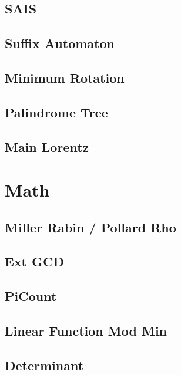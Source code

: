 \subsection{SAIS}

\subsection{Suffix Automaton}

\subsection{Minimum Rotation}

\subsection{Palindrome Tree}

\subsection{Main Lorentz}


\section{Math}
% 
\subsection{Miller Rabin / Pollard Rho}

\subsection{Ext GCD}

\subsection{PiCount}

\subsection{Linear Function Mod Min}

\subsection{Determinant}


